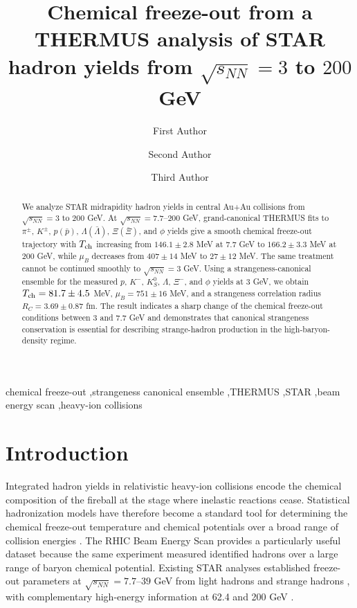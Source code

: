 \documentclass[preprint,12pt]{elsarticle}
\begin{document}
\begin{frontmatter}

\title{Chemical freeze-out from a THERMUS analysis of STAR hadron yields from $\sqrt{s_{NN}}=3$ to $200$ GeV}

\author[inst1]{First Author}
\author[inst1]{Second Author}
\author[inst2]{Third Author}
\address[inst1]{Affiliation 1, City, Country}
\address[inst2]{Affiliation 2, City, Country}

\begin{abstract}
We analyze STAR midrapidity hadron yields in central Au+Au collisions from $\sqrt{s_{NN}}=3$ to $200$ GeV.
At $\sqrt{s_{NN}}=7.7$--$200$ GeV, grand-canonical THERMUS fits to $\pi^\pm$, $K^\pm$, $p(\bar p)$, $\Lambda(\bar\Lambda)$, $\Xi(\bar\Xi)$, and $\phi$ yields give a smooth chemical freeze-out trajectory with $T_{\rm ch}$ increasing from $146.1\pm2.8$ MeV at $7.7$ GeV to $166.2\pm3.3$ MeV at $200$ GeV, while $\mu_B$ decreases from $407\pm14$ MeV to $27\pm12$ MeV.
The same treatment cannot be continued smoothly to $\sqrt{s_{NN}}=3$ GeV.
Using a strangeness-canonical ensemble for the measured $p$, $K^-$, $K^0_S$, $\Lambda$, $\Xi^-$, and $\phi$ yields at 3 GeV, we obtain $T_{\rm ch}=81.7\pm4.5$ MeV, $\mu_B=751\pm16$ MeV, and a strangeness correlation radius $R_C=3.69\pm0.87$ fm.
The result indicates a sharp change of the chemical freeze-out conditions between 3 and 7.7 GeV and demonstrates that canonical strangeness conservation is essential for describing strange-hadron production in the high-baryon-density regime.
\end{abstract}

\begin{keyword}
chemical freeze-out \sep strangeness canonical ensemble \sep THERMUS \sep STAR \sep beam energy scan \sep heavy-ion collisions
\end{keyword}

\end{frontmatter}

\section{Introduction}

Integrated hadron yields in relativistic heavy-ion collisions encode the chemical composition of the fireball at the stage where inelastic reactions cease.
Statistical hadronization models have therefore become a standard tool for determining the chemical freeze-out temperature and chemical potentials over a broad range of collision energies \cite{Andronic2018Nature,Wheaton2009THERMUS}.
The RHIC Beam Energy Scan provides a particularly useful dataset because the same experiment measured identified hadrons over a large range of baryon chemical potential.
Existing STAR analyses established freeze-out parameters at $\sqrt{s_{NN}}=7.7$--$39$ GeV from light hadrons and strange hadrons \cite{STARBulk2017,STARStrange2020}, with complementary high-energy information at 62.4 and 200 GeV \cite{STARIdentified2009,STARStrange2007,STARStrange2011}.
\end{document}
